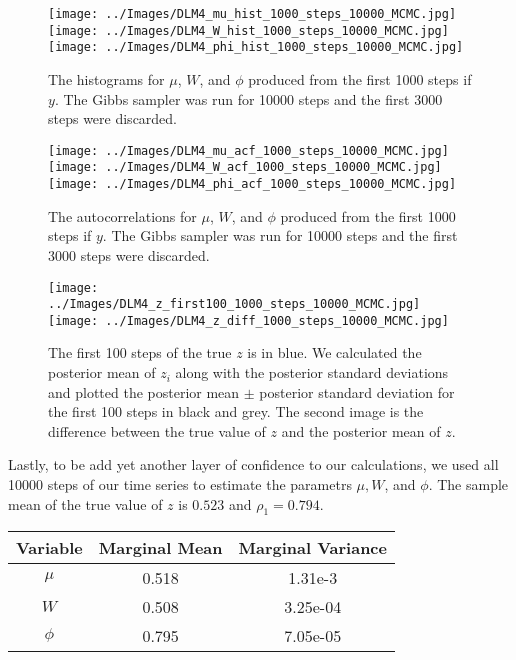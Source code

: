 \documentclass{article}
\begin{document}
\begin{figure}[!h]
\begin{center}
\texttt{[image: ../Images/DLM4\_mu\_hist\_1000\_steps\_10000\_MCMC.jpg]}
\texttt{[image: ../Images/DLM4\_W\_hist\_1000\_steps\_10000\_MCMC.jpg]}
\texttt{[image: ../Images/DLM4\_phi\_hist\_1000\_steps\_10000\_MCMC.jpg]}
\end{center}
\label{DLM4:histograms}
\caption{The histograms for $\mu$, $W$, and $\phi$ produced from the first 1000 steps if $y$.  The Gibbs sampler was run for 10000 steps and the first 3000 steps were discarded.}
\end{figure}

\begin{figure}[!h]
\begin{center}
\texttt{[image: ../Images/DLM4\_mu\_acf\_1000\_steps\_10000\_MCMC.jpg]}
\texttt{[image: ../Images/DLM4\_W\_acf\_1000\_steps\_10000\_MCMC.jpg]}
\texttt{[image: ../Images/DLM4\_phi\_acf\_1000\_steps\_10000\_MCMC.jpg]}
\end{center}
\caption{The autocorrelations for $\mu$, $W$, and $\phi$ produced from the first 1000 steps if $y$.  The Gibbs sampler was run for 10000 steps and the first 3000 steps were discarded.}
\end{figure}

\begin{figure}[!h]
\begin{center}
\texttt{[image: ../Images/DLM4\_z\_first100\_1000\_steps\_10000\_MCMC.jpg]}
\texttt{[image: ../Images/DLM4\_z\_diff\_1000\_steps\_10000\_MCMC.jpg]}
\end{center}
\label{fig:DLM4:z_stuff}
\caption{The first 100 steps of the true $z$ is in blue.  We calculated the posterior mean of $z_i$ along with the posterior standard deviations and plotted the posterior mean $\pm$ posterior standard deviation for the first 100 steps in black and grey.  The second image is the difference between the true value of $z$ and the posterior mean of $z$.}
\end{figure}

Lastly, to be add yet another layer of confidence to our calculations, we used all 10000 steps of our time series to estimate the parametrs $\mu, W$, and $\phi$.  The sample mean of the true value of $z$ is $0.523$ and $\rho_1 = 0.794$.

\begin{center}
\begin{tabular}{c | c | c}
Variable & Marginal Mean & Marginal Variance \\
\hline
$\mu$ & 0.518 & 1.31e-3 \\
$W$ & 0.508 & 3.25e-04 \\
$\phi$ & 0.795 & 7.05e-05 \\
\end{tabular}
\end{center}
\end{document}

